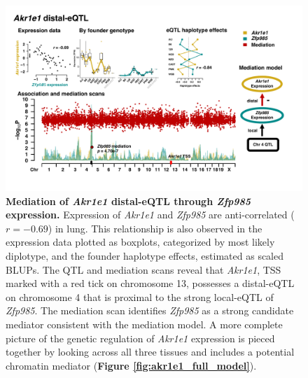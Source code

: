 \documentclass[9pt,twocolumn,twoside]{gsajnl}
\begin{document}
\begin{figure}[hp]
\renewcommand{\familydefault}{\sfdefault}\normalfont
\centering
\includegraphics[width=\textwidth, trim={0in 0.5in 0in 0in}, clip]{figs/akr1e1_mediation.pdf}
\caption{\textbf{Mediation of \textit{Akr1e1} distal-eQTL through \textit{Zfp985} expression.} Expression of \textit{Akr1e1} and \textit{Zfp985} are anti-correlated ($r = -0.69$) in lung. This relationship is also observed in the expression data plotted as boxplots, categorized by most likely diplotype, and the founder haplotype effects, estimated as scaled BLUPs. The QTL and mediation scans reveal that \textit{Akr1e1}, TSS marked with a red tick on chromosome 13, possesses a distal-eQTL on chromosome 4 that is proximal to the strong local-eQTL of \textit{Zfp985}. The mediation scan identifies \textit{Zfp985} as a strong candidate mediator consistent with the mediation model. A more complete picture of the genetic regulation of \textit{Akr1e1} expression is pieced together by looking across all three tissues and includes a potential chromatin mediator (\textbf{Figure \ref{fig:akr1e1_full_model}}).
\label{fig:akr1e1_exmediation}}
\end{figure}
\end{document}
